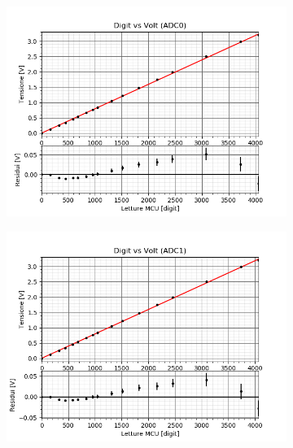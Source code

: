 \documentclass{article}[a4paper, oneside, 11pt]
\begin{document}
\begin{figure}[H]%
\centering
\begin{subfigure}{.5\textwidth}
	\centering 
 		\includegraphics[scale=0.5]{./digitvsvolt_ADC0_1.png}
	\label{fig: nofilter}
\end{subfigure}%
\begin{subfigure} {.5\textwidth}
	\centering 
		\includegraphics[scale=0.5]{./digitvsvolt_ADC1_1.png}
	\label{fig: filtered}
\end{subfigure}
\end{figure}
\end{document}
